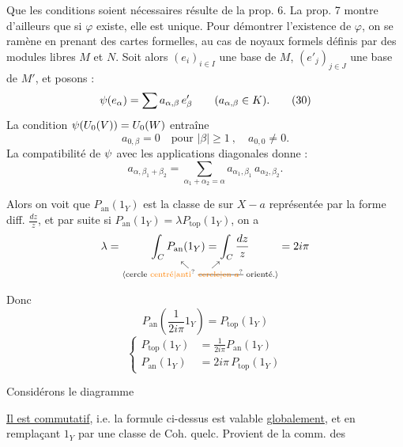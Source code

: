 Que les conditions soient nécessaires résulte de la prop. 6. La prop. 7 montre d'ailleurs que si $\varphi$ existe, elle est unique. Pour démontrer l'existence de $\varphi$, on se ramène en prenant des cartes formelles, au cas de noyaux formels définis par des modules libres $M$ et $N$. Soit alors $(e_i)_{i\in I}$ une base de $M$, $(e'_j)_{j\in J}$ une base de $M'$, et posons :
\[
\psi(e_\alpha)=\sum a_{\alpha,\beta}\,e'_\beta \qquad(a_{\alpha,\beta}\in K).\tag*{(30)}
\]
La condition $\psi(U_0(V))=U_0(W)$ entraîne
\[
a_{0,\beta}=0\quad\text{pour }|\beta|\geq 1\ ,\quad a_{0,0}\neq 0.\tag*{(31)}
\]
La compatibilité de $\psi$ avec les applications diagonales donne :
\[
a_{\alpha,\beta_1+\beta_2}=\sum_{\alpha_1+\alpha_2=\alpha}a_{\alpha_1,\beta_1}\,a_{\alpha_2,\beta_2}.\tag*{(32)}
\]


Alors on voit que $P_{\mathrm{an}}(1_Y)$ est la classe de  sur $X-a$ représentée par la forme diff. $\frac{dz}{z}$, et par suite  si $P_{\mathrm{an}}(1_Y)=\lambda P_{\mathrm{top}}(1_Y)$, on a
\[
\lambda=\underset{\substack{\nwarrow\qquad\nearrow\\\text{\inserted{cercle \unsure{centré|anti} \deleted{\unsure{cercle|en $a$}} orienté.}}}}{\int_C P_{\mathrm{an}}(1_Y)=\int_C\frac{dz}{z}}=2i\pi
\]

Donc
\[
\boxed{P_{\mathrm{an}}\left(\frac{1}{2i\pi}1_Y\right)=P_{\mathrm{top}}(1_Y)}
\]
\[
\boxed{\left\{\begin{aligned}
P_{\mathrm{top}}(1_Y)&=\frac{1}{2i\pi}P_{\mathrm{an}}(1_Y)\\
P_{\mathrm{an}}(1_Y)&=2i\pi\,P_{\mathrm{top}}(1_Y)
\end{aligned}\right.}
\]

\uline{} Considérons le diagramme

\uline{Il est commutatif}, i.e. la formule ci-dessus est valable \uline{globalement}, et en remplaçant $1_Y$ par une classe de Coh. quelc. Provient de la comm. des
